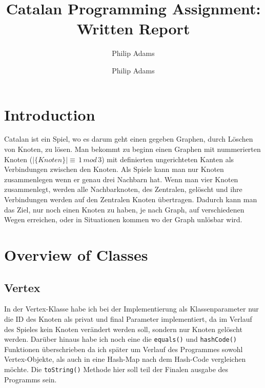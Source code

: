 \documentclass[12pt,a4paper]{article}
\author{Philip Adams}
\title{Catalan Programming Assignment: \\Written Report}
\author{Philip Adams}
\begin{document}
\maketitle

\section{Introduction}
Catalan ist ein Spiel, wo es darum geht einen gegeben Graphen, durch Löschen von Knoten, zu lösen. Man bekommt zu beginn einen Graphen mit nummerierten Knoten ($|\{Knoten\}| \equiv \,1\, mod\, 3$) mit definierten ungerichteten Kanten als Verbindungen zwischen den Knoten. Als Spiele kann man nur Knoten zusammenlegen wenn er genau drei Nachbarn hat. Wenn man vier Knoten zusammenlegt, werden alle Nachbarknoten, des Zentralen, gelöscht und ihre Verbindungen werden auf den Zentralen Knoten übertragen. Dadurch kann man das Ziel, nur noch einen Knoten zu haben, je nach Graph, auf verschiedenen Wegen erreichen, oder in Situationen kommen wo der Graph unlösbar wird.

\section{Overview of Classes}

\subsection{Vertex}
In der Vertex-Klasse habe ich bei der Implementierung als Klassenparameter nur  die ID des Knoten als privat und final Parameter implementiert, da im Verlauf des Spieles kein Knoten verändert werden soll, sondern nur Knoten gelöscht werden. Darüber hinaus habe ich noch eine die \texttt{equals()} und \texttt{hashCode()} Funktionen überschrieben da ich später um Verlauf des Programmes sowohl Vertex-Objekte, als auch in eine Hash-Map nach dem Hash-Code vergleichen möchte. Die \texttt{toString()} Methode hier soll teil der Finalen ausgabe des Programms sein.
\end{document}

